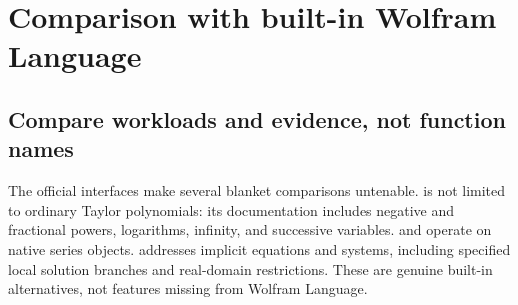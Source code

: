 \documentclass[11pt,letterpaper]{article}
\theoremstyle{definition}\newtheorem{definition}[proposition]{Definition}
\begin{document}
\section{Comparison with built-in Wolfram Language}
\subsection{Compare workloads and evidence, not function names}
The official interfaces make several blanket comparisons untenable.
 is not limited to ordinary Taylor polynomials: its documentation
includes negative and fractional powers, logarithms, infinity, and successive
variables.  and  operate on native
series objects.  addresses implicit equations and systems,
including specified local solution branches and real-domain restrictions.
These are genuine built-in alternatives, not features missing from Wolfram
Language.\cite{wlseries,wlinverse,wlcompose,wlasymptoticsolve}
\end{document}
